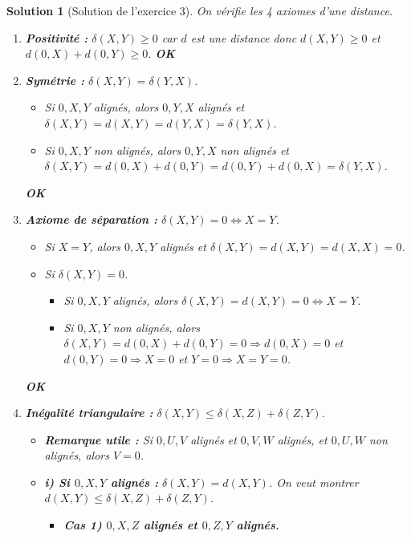 \documentclass{article}
\newtheorem{solution}{Solution}
\begin{document}
\begin{solution}[Solution de l'exercice 3]
On vérifie les 4 axiomes d'une distance.
\begin{enumerate}
    \item \textbf{Positivité :} $\delta(X, Y) \geq 0$ car $d$ est une distance donc $d(X, Y) \geq 0$ et $d(0, X) + d(0, Y) \geq 0$. \textbf{OK}
    \item \textbf{Symétrie :} $\delta(X, Y) = \delta(Y, X)$.
    \begin{itemize}
        \item Si $0, X, Y$ alignés, alors $0, Y, X$ alignés et $\delta(X, Y) = d(X, Y) = d(Y, X) = \delta(Y, X)$.
        \item Si $0, X, Y$ non alignés, alors $0, Y, X$ non alignés et $\delta(X, Y) = d(0, X) + d(0, Y) = d(0, Y) + d(0, X) = \delta(Y, X)$.
    \end{itemize}
    \textbf{OK}
    \item \textbf{Axiome de séparation :} $\delta(X, Y) = 0 \Leftrightarrow X = Y$.
    \begin{itemize}
        \item Si $X = Y$, alors $0, X, Y$ alignés et $\delta(X, Y) = d(X, Y) = d(X, X) = 0$.
        \item Si $\delta(X, Y) = 0$.
        \begin{itemize}
            \item Si $0, X, Y$ alignés, alors $\delta(X, Y) = d(X, Y) = 0 \Leftrightarrow X = Y$.
            \item Si $0, X, Y$ non alignés, alors $\delta(X, Y) = d(0, X) + d(0, Y) = 0 \Rightarrow d(0, X) = 0$ et $d(0, Y) = 0 \Rightarrow X = 0$ et $Y = 0 \Rightarrow X = Y = 0$.
        \end{itemize}
    \end{itemize}
    \textbf{OK}
    \item \textbf{Inégalité triangulaire :} $\delta(X, Y) \leq \delta(X, Z) + \delta(Z, Y)$.
    \begin{itemize}
        \item \textbf{Remarque utile :} Si $0, U, V$ alignés et $0, V, W$ alignés, et $0, U, W$ non alignés, alors $V = 0$.
        \item \textbf{i) Si $0, X, Y$ alignés : } $\delta(X, Y) = d(X, Y)$.
        On veut montrer $d(X, Y) \leq \delta(X, Z) + \delta(Z, Y)$.
        \begin{itemize}
            \item \textbf{Cas 1) $0, X, Z$ alignés et $0, Z, Y$ alignés. }

\end{itemize}
\end{itemize}
\end{enumerate}
\end{solution}
\end{document}
